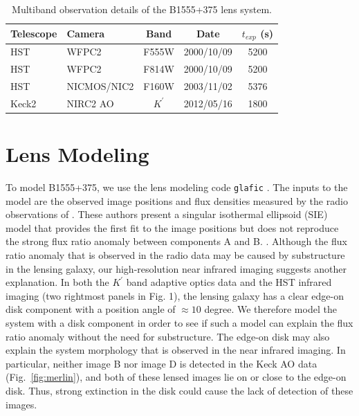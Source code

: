 \documentclass[useAMS,usenatbib]{mn2e}
\begin{document}
\begin{table}
 \centering
  \caption{Multiband observation details of the B1555+375 lens system.}
  \begin{tabular}{@{}llccc}
  
\hline
  Telescope     &      Camera     &  Band & Date &$t_{exp}$ (s) \\

 \hline
   HST				&		WFPC2    &  F555W		&	2000/10/09 	&	5200\\
   HST				&		WFPC2    &  F814W		&	2000/10/09 &	5200\\
   HST				&		NICMOS/NIC2	&	F160W	&	2003/11/02 & 5376\\
   Keck2			&		NIRC2 AO	&   $K^\prime$	& 2012/05/16	&  1800\\
   \hline
\end{tabular}
\end{table}


\section{Lens Modeling}

To model B1555+375, we use the lens modeling code {\tt glafic}
\citep{Oguri}.  The inputs to the model are the observed image
positions and flux densities measured by the radio observations of
\citet{Marlow99}.  These authors present a singular isothermal ellipsoid
(SIE) model that provides the first fit to the image positions but
does not reproduce the strong flux ratio anomaly between components A
and B.  \citep[see Fig.~6 and Tables 2 \& 3 in][]{Marlow99}.  Although
the flux ratio anomaly that is observed in the radio data may be
caused by substructure in the lensing galaxy, our high-resolution near
infrared imaging suggests another explanation.  In both the $K^\prime$
band adaptive optics data and the HST infrared imaging (two rightmost panels in
Fig. 1), the lensing galaxy has a clear edge-on disk component with a
position angle of $\approx 10$ degree.  We therefore model the system
with a disk component in order to see if such a model can explain the
flux ratio anomaly without the need for substructure.  The edge-on
disk may also explain the system morphology that is observed in the
near infrared imaging.  In particular, neither image B nor image D is
detected in the Keck AO data (Fig.~\ref{fig:merlin}), and both of
these lensed images lie on or close to the edge-on disk.  Thus, strong
extinction in the disk could cause the lack of detection of these
images.
\end{document}
